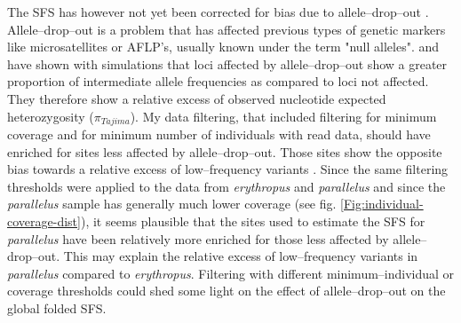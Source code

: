 \documentclass[a4paper,12pt,times,print,index,custombib,custommargin]{PhDThesisPSnPDF}\usepackage[]{graphicx}\usepackage[]{color}
\begin{document}
The \gls{SFS} has however not yet been corrected for bias due to allele--drop--out \citep{Luca2011, Cariou2016}. Allele--drop--out is a problem that has affected previous types of genetic markers like microsatellites or AFLP's, usually known under the term "null alleles". \cite{Arnold2013} and \cite{Gautier2012} have shown with simulations that loci affected by allele--drop--out show a greater proportion of intermediate allele frequencies as compared to loci not affected. They therefore show a relative excess of observed nucleotide expected heterozygosity ($\pi_{Tajima}$). My data filtering, that included filtering for minimum coverage and for minimum number of individuals with read data, should have enriched for sites less affected by allele--drop--out. Those sites show the opposite bias towards a relative excess of low--frequency variants \citep{Arnold2013}. Since the same filtering thresholds were applied to the data from \textit{erythropus} and \textit{parallelus} and since the \textit{parallelus} sample has generally much lower coverage (see fig. \ref{Fig:individual-coverage-dist}), it seems plausible that the sites used to estimate the \gls{SFS} for \textit{parallelus} have been relatively more enriched for those less affected by allele--drop--out. This may explain the relative excess of low--frequency variants in \textit{parallelus} compared to \textit{erythropus}. Filtering with different minimum--individual or coverage thresholds could shed some light on the effect of allele--drop--out on the global folded \gls{SFS}. 
\end{document}
